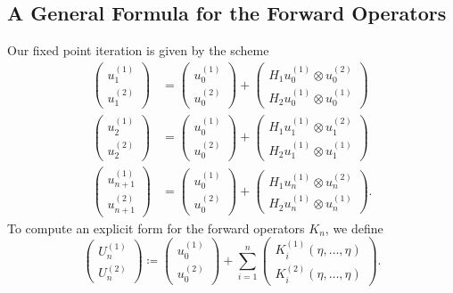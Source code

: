 \documentclass[a4paper, 12pt]{article}
\begin{document}
\subsection{A General Formula for the Forward Operators}
Our fixed point iteration is given by the scheme
\begin{align*}
	\begin{pmatrix} u_1^{(1)}\\u_1^{(2)}\end{pmatrix}  &= \begin{pmatrix} u_0^{(1)}\\u_0^{(2)} \end{pmatrix} + \begin{pmatrix} H_1 u_0^{(1)}\otimes u_0^{(2)}\\H_2 u_0^{(1)} \otimes u_0^{(1)}\end{pmatrix} \\
	\begin{pmatrix} u_2^{(1)}\\u_2^{(2)}\end{pmatrix}  &= \begin{pmatrix} u_0^{(1)}\\u_0^{(2)} \end{pmatrix} + \begin{pmatrix} H_1 u_1^{(1)}\otimes u_1^{(2)}\\H_2 u_1^{(1)} \otimes u_1^{(1)}\end{pmatrix} \\
	\begin{pmatrix} u_{n + 1}^{(1)}\\u_{n + 1}^{(2)}\end{pmatrix} &= \begin{pmatrix} u_0^{(1)}\\u_0^{(2)} \end{pmatrix} + \begin{pmatrix} H_1 u_n^{(1)}\otimes u_n^{(2)}\\H_2 u_n^{(1)} \otimes u_n^{(1)}\end{pmatrix}
.\end{align*}
To compute an explicit form for the forward operators $K_{n}$, we define
\[
\begin{pmatrix} U_n^{(1)}\\U_n^{(2)} \end{pmatrix}
\coloneqq\begin{pmatrix} u_0^{(1)}\\u_0^{(2)} \end{pmatrix}  + \sum_{i=1}^{n} \begin{pmatrix} K_i^{(1)}\left( \eta,\ldots,\eta \right)\\K_i^{(2)} \left( \eta,\ldots,\eta \right)\end{pmatrix}
.\]
\end{document}
